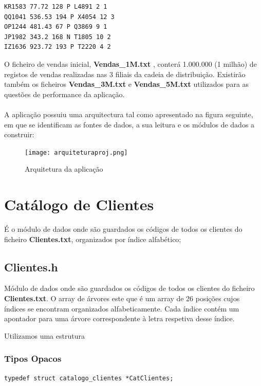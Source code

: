  \begin{Verbatim}
KR1583 77.72 128 P L4891 2 1
QQ1041 536.53 194 P X4054 12 3
OP1244 481.43 67 P Q3869 9 1
JP1982 343.2 168 N T1805 10 2
IZ1636 923.72 193 P T2220 4 2 
 \end{Verbatim}
 
O ficheiro de vendas inicial, \textbf{Vendas\_1M.txt} , conterá 1.000.000 (1 milhão) de registos de vendas realizadas nas 3 filiais da cadeia de distribuição. Existirão também os ficheiros  \textbf{Vendas\_3M.txt} e  \textbf{Vendas\_5M.txt} utilizados para as questões de performance da aplicação. 

\newpage 
\paragraph{}
A aplicação possuiu uma arquitectura tal como apresentado na figura seguinte, em que se identificam as fontes de dados, a sua leitura e os módulos de dados a construir: 

\begin{figure}[h!]
	\texttt{[image: arquiteturaproj.png]}  
	\caption{Arquitetura da aplicação}  
\end{figure}


\section{Catálogo de Clientes}
É o módulo de dados onde são guardados os códigos de todos os clientes do ficheiro \textbf{Clientes.txt}, organizados por índice alfabético; 

\subsection{Clientes.h}

Módulo de dados onde são guardados os códigos de todos os clientes do ficheiro \textbf{Clientes.txt}. O array de árvores este que é um array de 26 posições cujos índices se encontram organizados alfabeticamente. Cada índice contém um apontador para uma árvore correspondente à letra respetiva desse índice.

Utilizamos uma estrutura 

\subsubsection{Tipos Opacos}


\begin{Verbatim}
typedef struct catalogo_clientes *CatClientes;
\end{Verbatim}

